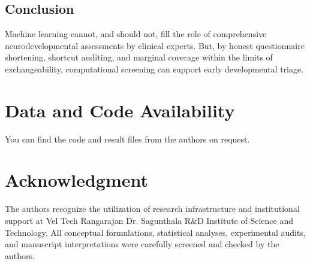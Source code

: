 \documentclass[conference]{IEEEtran}
\begin{document}
\subsection{Conclusion}
Machine learning cannot, and should not, fill the role of comprehensive neurodevelopmental assessments by clinical experts. But, by honest questionnaire shortening, shortcut auditing, and marginal coverage within the limits of exchangeability, computational screening can support early developmental triage.

\section*{Data and Code Availability}
You can find the code and result files from the authors on request.

\section*{Acknowledgment}
The authors recognize the utilization of research infrastructure and institutional support at Vel Tech Rangarajan Dr. Sagunthala R\&D Institute of Science and Technology. All conceptual formulations, statistical analyses, experimental audits, and manuscript interpretations were carefully screened and checked by the authors.
\end{document}
